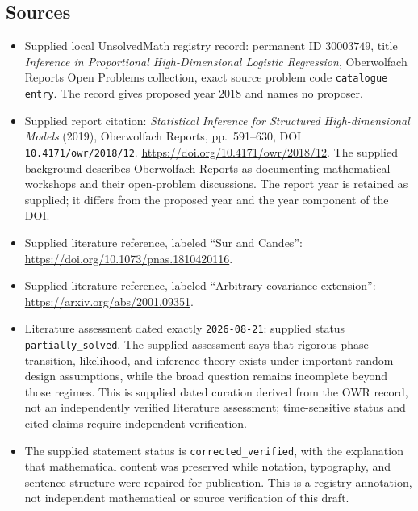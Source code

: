 \documentclass[11pt]{article}
\begin{document}
\subsection{Sources}
\begin{itemize}
\item Supplied local UnsolvedMath registry record: permanent ID \(30003749\), title \emph{Inference in Proportional High-Dimensional Logistic Regression}, Oberwolfach Reports Open Problems collection, exact source problem code \texttt{catalogue entry}. The record gives proposed year \(2018\) and names no proposer.
\item Supplied report citation: \emph{Statistical Inference for Structured High-dimensional Models} (2019), Oberwolfach Reports, pp.\ 591--630, DOI \texttt{10.4171/owr/2018/12}. \url{https://doi.org/10.4171/owr/2018/12}. The supplied background describes Oberwolfach Reports as documenting mathematical workshops and their open-problem discussions. The report year is retained as supplied; it differs from the proposed year and the year component of the DOI.
\item Supplied literature reference, labeled ``Sur and Candes'': \url{https://doi.org/10.1073/pnas.1810420116}.
\item Supplied literature reference, labeled ``Arbitrary covariance extension'': \url{https://arxiv.org/abs/2001.09351}.
\item Literature assessment dated exactly \texttt{2026-08-21}: supplied status \texttt{partially\_solved}. The supplied assessment says that rigorous phase-transition, likelihood, and inference theory exists under important random-design assumptions, while the broad question remains incomplete beyond those regimes. This is supplied dated curation derived from the OWR record, not an independently verified literature assessment; time-sensitive status and cited claims require independent verification.
\item The supplied statement status is \texttt{corrected\_verified}, with the explanation that mathematical content was preserved while notation, typography, and sentence structure were repaired for publication. This is a registry annotation, not independent mathematical or source verification of this draft.
\end{itemize}
\end{document}
